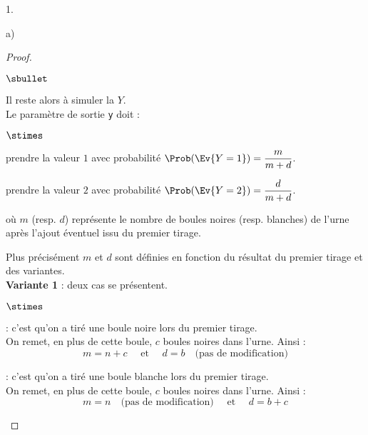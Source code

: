 \documentclass[11pt]{article}%
\begin{document}
\begin{noliste}{1.}
\begin{noliste}{a)}
\begin{proof}
\begin{noliste}{$\sbullet$}
      \item Il reste alors à simuler la \var $Y$.\\
        Le paramètre de sortie {\tt y} doit :
        \begin{noliste}{$\stimes$}
        \item prendre la valeur $1$ avec probabilité $\Prob(\Ev{Y =
            1}) = \dfrac{m}{m+d}$.
        \item prendre la valeur $2$ avec probabilité $\Prob(\Ev{Y =
            2}) = \dfrac{d}{m+d}$.
        \end{noliste}
        où $m$ (resp. $d$) représente le nombre de boules noires
        (resp. blanches) de l'urne après l'ajout éventuel issu du
        premier tirage.
      \item Plus précisément $m$ et $d$ sont définies en fonction du
        résultat du premier tirage et des variantes.\\
        {\bf Variante 1} : deux cas se présentent.
        \begin{noliste}{$\stimes$}
        \item {} : c'est qu'on a tiré une
          boule noire lors du premier tirage.\\
          On remet, en plus de cette boule, $c$ boules noires dans
          l'urne. Ainsi : 
          \[
          m = n + c \quad \text{ et } \quad d = b \quad \text{(pas de
            modification)}
          \]
        \item {} : c'est qu'on a
          tiré une boule blanche lors du premier tirage.\\
          On remet, en plus de cette boule, $c$ boules noires dans
          l'urne. Ainsi :
          \[
          m = n \quad \text{(pas de modification)} \quad \text{ et }
          \quad d = b + c
          \]          
        \end{noliste}


        \newpage



\end{noliste}
\end{proof}
\end{noliste}
\end{noliste}
\end{document}
